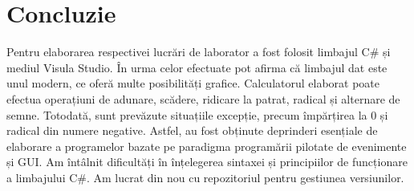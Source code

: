 \section*{Concluzie}
	Pentru elaborarea respectivei lucrări de laborator a fost folosit limbajul C# și mediul Visula Studio. În urma celor efectuate pot afirma că limbajul dat este unul modern, ce oferă multe posibilități grafice. 
	Calculatorul elaborat poate efectua operațiuni de adunare, scădere, ridicare la patrat, radical și alternare de semne. Totodată, sunt prevăzute situațiile excepție, precum împărțirea la 0 și radical din numere negative.
	Astfel, au fost obținute deprinderi esențiale de elaborare a programelor bazate pe paradigma programării pilotate de evenimente și GUI. Am întâlnit dificultăți în înțelegerea sintaxei și principiilor de funcționare a limbajului C#.
	Am lucrat din nou cu repozitoriul pentru gestiunea versiunilor.

\clearpage